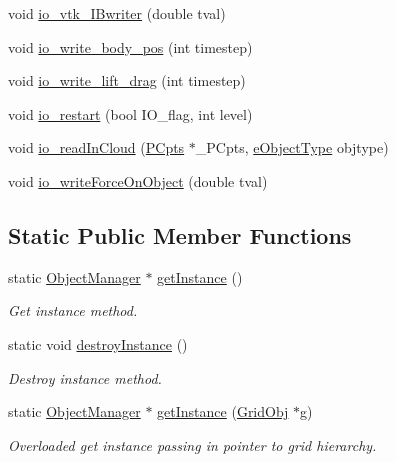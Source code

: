 \begin{DoxyCompactItemize}
void \hyperlink{class_object_manager_a39aa351c7b338473be4871111da5c5bd}{io\+\_\+vtk\+\_\+\+I\+Bwriter} (double tval)
\item 
void \hyperlink{class_object_manager_a1f9a40c58bdb3bd9797f7c44864835ec}{io\+\_\+write\+\_\+body\+\_\+pos} (int timestep)
\item 
void \hyperlink{class_object_manager_ab46e89c9eaf8ca1c9ec264545f39cd7f}{io\+\_\+write\+\_\+lift\+\_\+drag} (int timestep)
\item 
void \hyperlink{class_object_manager_aaa1b7e2a3392c2a8d85606041b986b4d}{io\+\_\+restart} (bool I\+O\+\_\+flag, int level)
\item 
void \hyperlink{class_object_manager_a5c11d747c3df9e91d5fc2dac836d7b7e}{io\+\_\+read\+In\+Cloud} (\hyperlink{class_p_cpts}{P\+Cpts} $\ast$\+\_\+\+P\+Cpts, \hyperlink{_object_manager_8h_a7b78fa3db30dfb9c1efc82bf886fe184}{e\+Object\+Type} objtype)
\item 
void \hyperlink{class_object_manager_adf65260d81584613fa33f2e7658f1b36}{io\+\_\+write\+Force\+On\+Object} (double tval)
\end{DoxyCompactItemize}
\subsection*{Static Public Member Functions}
\begin{DoxyCompactItemize}
\item 
static \hyperlink{class_object_manager}{Object\+Manager} $\ast$ \hyperlink{class_object_manager_acf7a2f12f034c76d9e3a5aa5837dddb5}{get\+Instance} ()
\begin{DoxyCompactList}\small\item\em Get instance method. \end{DoxyCompactList}\item 
static void \hyperlink{class_object_manager_a5945decc43eb5fdeaaad101fa7aa282f}{destroy\+Instance} ()
\begin{DoxyCompactList}\small\item\em Destroy instance method. \end{DoxyCompactList}\item 
static \hyperlink{class_object_manager}{Object\+Manager} $\ast$ \hyperlink{class_object_manager_a3c648f3d7388df47db0db9fcb4b8b618}{get\+Instance} (\hyperlink{class_grid_obj}{Grid\+Obj} $\ast$g)
\begin{DoxyCompactList}\small\item\em Overloaded get instance passing in pointer to grid hierarchy. \end{DoxyCompactList}\end{DoxyCompactItemize}
